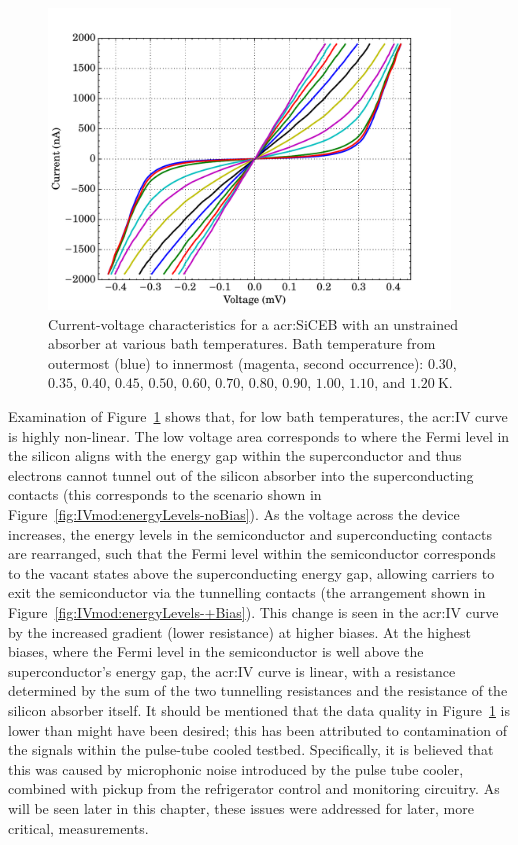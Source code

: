 \begin{figure}[tb]
\begin{center}
\includegraphics[width = 0.95\textwidth]{figures/control_IVs}
\caption[Current-voltage characteristics for a \gls{acr:SiCEB} with an unstrained absorber]{Current-voltage characteristics for a \gls{acr:SiCEB} with an unstrained absorber at various bath temperatures. Bath temperature from outermost (blue) to innermost (magenta, second occurrence): $0.30$, $0.35$, $0.40$, $0.45$, $0.50$, $0.60$, $0.70$, $0.80$, $0.90$, $1.00$, $1.10$, and $1.20~\mathrm{K}$.}
\label{fig:controlIVs}
\end{center}
\end{figure}
\par 
Examination of Figure~\ref{fig:controlIVs} shows that, for low bath temperatures, the \gls{acr:IV} curve is highly non-linear. The low voltage area corresponds to where the Fermi level in the silicon aligns with the energy gap within the superconductor and thus electrons cannot tunnel out of the silicon absorber into the superconducting contacts (this corresponds to the scenario shown in Figure~\ref{fig:IVmod:energyLevels-noBias}). As the voltage across the device increases, the energy levels in the semiconductor and superconducting contacts are rearranged, such that the Fermi level within the semiconductor corresponds to the vacant states above the superconducting energy gap, allowing carriers to exit the semiconductor via the tunnelling contacts (the arrangement shown in Figure~\ref{fig:IVmod:energyLevels-+Bias}). This change is seen in the \gls{acr:IV} curve by the increased gradient (lower resistance) at higher biases. At the highest biases, where the Fermi level in the semiconductor is well above the superconductor's energy gap, the \gls{acr:IV}  curve is linear, with a resistance determined by the sum of the two tunnelling resistances and the resistance of the silicon absorber itself. It should be mentioned that the data quality in Figure~\ref{fig:controlIVs} is lower than might have been desired; this has been attributed to contamination of the signals within the pulse-tube cooled testbed. Specifically, it is believed that this was caused by microphonic noise introduced by the pulse tube cooler, combined with pickup from the refrigerator control and monitoring circuitry. As will be seen later in this chapter, these issues were addressed for later, more critical, measurements.
